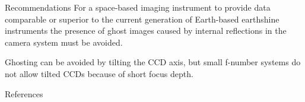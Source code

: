 \documentclass[final,hyperref={pdfpagelabels=false}]{beamer}
\begin{document}
\begin{frame}[t]
\begin{columns}[t]
\begin{column}{.23\textwidth}
\begin{block}{Recommendations}
For a space-based imaging instrument to provide data comparable or superior to the current generation of Earth-based earthshine instruments the presence of ghost images caused by internal reflections in the camera system must be avoided.

Ghosting can be avoided by tilting the CCD axis,
    but small f-number systems do not allow tilted CCDs because of short focus depth.




\end{block}
 




\begin{block}{References}
        
\small{
} 


\end{block}
\end{column}
\end{columns}
\end{frame}
\end{document}
